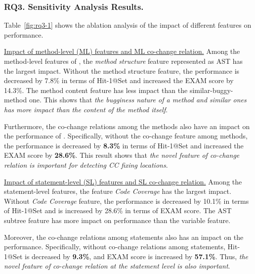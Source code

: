 \subsubsection{\bf RQ3. Sensitivity Analysis Results.}\label{sensi}

Table~\ref{fig:rq3-1} shows the ablation analysis of the
impact of different features on performance. 

\underline{Impact of method-level (ML) features and ML co-change relation.}
Among the method-level features of {\tool}, the {\it method structure}
feature represented as AST has the largest impact. Without the method
structure feature, the performance is decreased by 7.8\% in terms of
Hit-1@Set and increased the EXAM score by 14.3\%. The method content
feature has less impact than the similar-buggy-method one. This
shows that {\em the bugginess nature of a method and similar ones has
more impact than the content of the method itself}.


Furthermore, the co-change relations among the methods also have an
impact on the performance of {\tool}. Specifically, without the
co-change feature among methods, the performance is decreased by {\bf
8.3\%} in terms of Hit-1@Set and increased the EXAM score by {\bf
28.6\%}. This result shows that {\em the novel feature of co-change
relation is important for detecting CC fixing locations}.


\underline{Impact of statement-level (SL) features and SL co-change relation.}
Among the statement-level features, the feature {\it Code Coverage}
has the largest impact. Without {\it Code Coverage} feature, the
performance is decreased by 10.1\% in terms of Hit-1@Set and is
increased by 28.6\% in terms of EXAM score. The AST subtree feature
has more impact on performance than the variable feature.

Moreover, the co-change relations among statements also has an impact
on the performance. Specifically, without co-change relations among
statements, Hit-1@Set is decreased by {\bf 9.3\%}, and EXAM score is
increased by {\bf 57.1\%}. Thus, {\em the novel feature of co-change
relation at the statement level is also important}.



